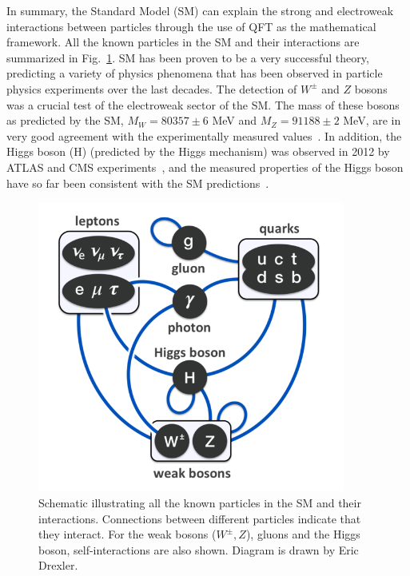 In summary, the Standard Model (SM) can explain the strong and electroweak interactions between particles through the use of QFT as the mathematical framework.
All the known particles in the SM and their interactions are summarized in Fig.~\ref{fig:sm_interactions}. SM has been proven to be a very successful theory,
predicting a variety of physics phenomena that has been observed in particle physics experiments over the last decades.
The detection of $W^{\pm}$ and $Z$ bosons~\cite{UA1:WBosonDiscovery} was a crucial test of the electroweak sector of the SM.
The mass of these bosons as predicted by the SM, $M_W = 80357 \pm 6$ MeV and $M_Z = 91188 \pm 2$ MeV, 
are in very good agreement with the experimentally measured values~\cite{ATLAS:WMassMeasurement, CMS:ZMassMeasurement}. In addition,
the Higgs boson (H) (predicted by the Higgs mechanism) was observed in 2012 by ATLAS and CMS experiments~\cite{Nisati:2015iwc}, and the 
measured properties of the Higgs boson have so far been consistent with the SM predictions~\cite{CMS:2022dwd}. 

\begin{figure}[htbp]
    \centering
    \includegraphics[width=0.9\textwidth]{SM_interactions.png}
    \caption{Schematic illustrating all the known particles in the SM and their interactions. Connections between different
    particles indicate that they interact. For the weak bosons ($W^{\pm}, Z$), gluons and the Higgs boson, self-interactions
    are also shown. Diagram is drawn by Eric Drexler.}
    \label{fig:sm_interactions}
\end{figure}

\clearpage